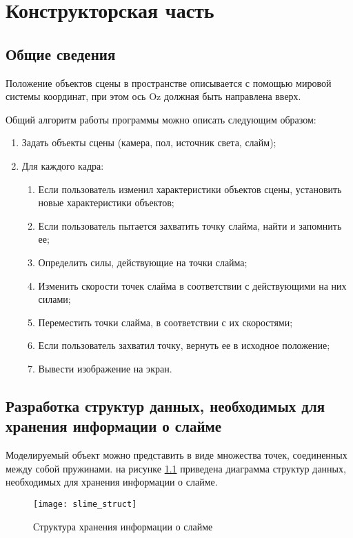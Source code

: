\chapter{Конструкторская часть}

\section{Общие сведения}

Положение объектов сцены в пространстве описывается с помощью
мировой системы координат, при этом ось Oz должная быть направлена вверх.

Общий алгоритм работы программы можно описать следующим образом:

\begin{enumerate}
	\item Задать объекты сцены (камера, пол, источник света, слайм);
	\item Для каждого кадра:
	\begin{enumerate}
		\item Если пользователь изменил характеристики объектов сцены, установить новые характеристики объектов;
		\item Если пользователь пытается захватить точку слайма, найти и запомнить ее;
		\item Определить силы, действующие на точки слайма;
		\item Изменить скорости точек слайма в соответствии с действующими на них силами;
		\item Переместить точки слайма, в соответствии с их скоростями;
		\item Если пользователь захватил точку, вернуть ее в исходное положение;
		\item Вывести изображение на экран.
	\end{enumerate}
\end{enumerate}

\section{Разработка структур данных, необходимых для хранения информации о слайме}

Моделируемый объект можно представить в виде множества точек, соединенных между собой пружинами. на рисунке \ref{slime_struct} приведена диаграмма структур данных, необходимых для хранения информации о слайме.

\begin{figure}[H]
	\centering
	\texttt{[image: slime\_struct]}
	\caption{Структура хранения информации о слайме}
	\label{slime_struct}
\end{figure}

